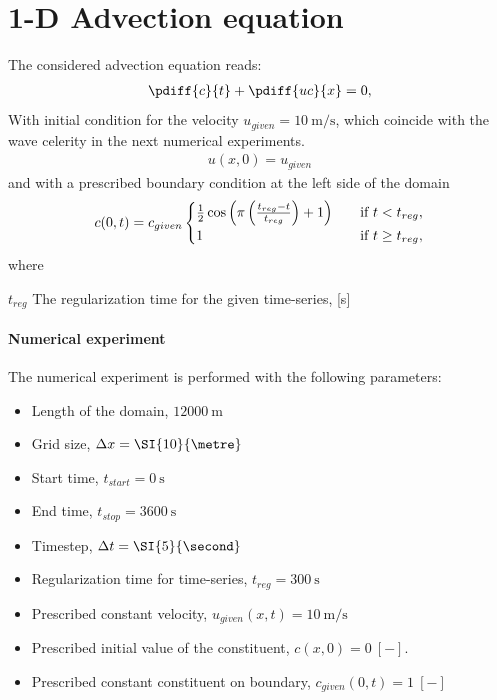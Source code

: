 \section{1-D Advection equation}
The considered advection equation reads:
\begin{align}
    \pdiff{c}{t} + \pdiff{uc}{x} = 0,
\end{align}
With initial condition for the velocity $u_{given} = \SI{10}{\metre\per\second}$, which coincide with the wave celerity in the next numerical experiments.
\begin{align}
    u(x,0) = u_{given}
\end{align}
and with a prescribed boundary condition at the left side of the domain
\begin{align}
    c(0,t) = c_{given}
    \begin{cases}
        \frac{1}{2} \cos\left(\pi \left(\frac{t_{reg} - t}{t_{reg}}\right)+ 1\right) &\quad \text{if } t < t_{reg},
        \\
        1 &\quad \text{if } t \geq t_{reg},
    \end{cases}
\end{align}
where
\begin{symbollist}
    \item[$t_{reg}$] The regularization time for the given time-series, [\si{\second}]
\end{symbollist}
\paragraph*{Numerical experiment}
The numerical experiment is performed with the following parameters:
\begin{itemize}
    \item Length of the domain, $\SI{12000}{\metre}$
    \item Grid size, $\Dx = \SI{10}{\metre}$
    \item Start time, $t_{start} = \SI{0}{\second}$
    \item End time, $t_{stop} = \SI{3600}{\second}$
    \item Timestep, $\Dt = \SI{5}{\second}$
    \item Regularization time for time-series, $t_{reg} = \SI{300}{\second}$
    \item Prescribed constant velocity, $u_{given}(x,t) = \SI{10}{\metre\per\second}$
    \item Prescribed initial value of the constituent, $c(x,0)= \SI{0}{[-]}$.
    \item Prescribed constant constituent on boundary, $c_{given}(0,t) = \SI{1}{[-]}$
\end{itemize}


